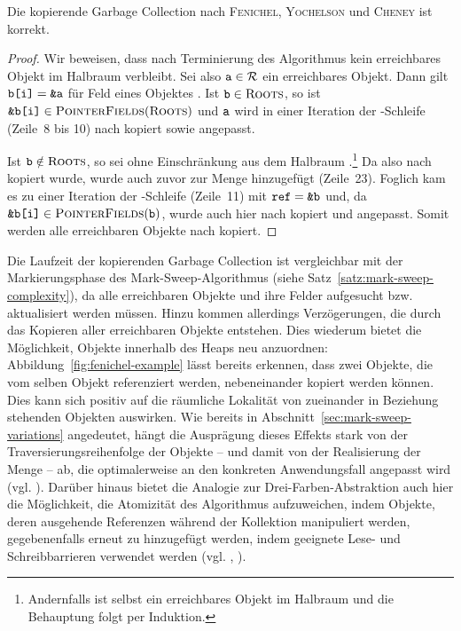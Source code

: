 \newpage

\begin{mybox}
\begin{satz}
	Die kopierende Garbage Collection nach \textsc{Fenichel}, \textsc{Yochelson} und \textsc{Cheney} ist korrekt.
\end{satz}
\end{mybox}

\begin{proof}
	Wir beweisen, dass nach Terminierung des Algorithmus kein erreichbares Objekt im Halbraum  verbleibt.
	Sei also $\texttt{a} \in \mathcal{R}$ ein erreichbares Objekt.
	Dann gilt $\texttt{b[i]} = \texttt{\&a}$ für Feld  eines Objektes .
	Ist $\texttt{b} \in \textsc{Roots}$, so ist $\texttt{\&b[i]} \in \textsc{PointerFields}(\textsc{Roots})$ und $\texttt{a}$ wird in einer Iteration der \FOREACH-Schleife (Zeile~8 bis 10) nach  kopiert sowie  angepasst.
	
	Ist $\texttt{b} \notin \textsc{Roots}$, so sei  ohne Einschränkung aus dem Halbraum .\footnote{Andernfalls ist  selbst ein erreichbares Objekt im Halbraum  und die Behauptung folgt per Induktion.}
	Da  also nach  kopiert wurde, wurde  auch zuvor zur Menge  hinzugefügt (Zeile~23).
	Foglich kam es zu einer Iteration der \WHILE-Schleife (Zeile~11) mit $\texttt{ref} = \texttt{\&b}$ und, da $\texttt{\&b[i]} \in \textsc{PointerFields}(\texttt{b})$, wurde auch hier  nach  kopiert und  angepasst.
	Somit werden alle erreichbaren Objekte nach  kopiert.	
\end{proof}

Die Laufzeit der kopierenden Garbage Collection ist vergleichbar mit der Markierungsphase des Mark-Sweep-Algorithmus (siehe Satz~\ref{satz:mark-sweep-complexity}), da alle erreichbaren Objekte und ihre Felder aufgesucht bzw. aktualisiert werden müssen.
Hinzu kommen allerdings Verzögerungen, die durch das Kopieren aller erreichbaren Objekte entstehen.
Dies wiederum bietet die Möglichkeit, Objekte innerhalb des Heaps neu anzuordnen:
Abbildung~\ref{fig:fenichel-example} lässt bereits erkennen, dass zwei Objekte, die vom selben Objekt referenziert werden, nebeneinander kopiert werden können.
Dies kann sich positiv auf die räumliche Lokalität von zueinander in Beziehung stehenden Objekten auswirken.
Wie bereits in Abschnitt~\ref{sec:mark-sweep-variations} angedeutet, hängt die Ausprägung dieses Effekts stark von der Traversierungsreihenfolge der Objekte -- und damit von der Realisierung der Menge  -- ab, die optimalerweise an den konkreten Anwendungsfall angepasst wird (vgl. \cite[Kap. 4.2]{handbook}).
Darüber hinaus bietet die Analogie zur Drei-Farben-Abstraktion auch hier die Möglichkeit, die Atomizität des Algorithmus aufzuweichen, indem Objekte, deren ausgehende Referenzen während der Kollektion manipuliert werden, gegebenenfalls erneut zu  hinzugefügt werden, indem geeignete Lese- und Schreibbarrieren verwendet werden (vgl. \cite[S. 129]{kero2007}, \cite[S. 41]{hosking2006}).

